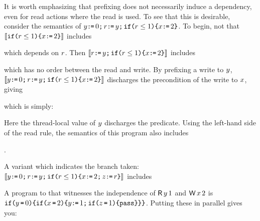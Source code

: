 It is worth emphasizing that prefixing does not necessarily induce a
dependency, even for read actions where the read is used.  To see that this
is desirable, consider  the semantics of
$\bLoc\GETS0\SEMI\aReg\GETS\bLoc\SEMI\IF{\aReg\leq1}\THEN \aLoc\GETS 2\FI$.
To begin, not that 
$\sem{\IF{\aReg\leq1}\THEN \aLoc\GETS 2\FI}$ includes
\begin{tikzinline}[node distance=1em]
\end{tikzinline}
which depends on $\aReg$.
Then $\sem{\aReg\GETS\bLoc\SEMI\IF{\aReg\leq1}\THEN \aLoc\GETS 2\FI}$ includes
\begin{tikzdisplay}[node distance=1em]
\end{tikzdisplay}
which has no order between the read and write.
By prefixing a write to $\bLoc$, $\sem{\bLoc\GETS0\SEMI\aReg\GETS\bLoc\SEMI\IF{\aReg\leq1}\THEN \aLoc\GETS
  2\FI}$ discharges the precondition of the write to $\aLoc$, giving
\begin{tikzinline}[node distance=1em]
\end{tikzinline}
which is simply:
\begin{tikzdisplay}[node distance=1em]
\end{tikzdisplay}
Here the thread-local value of $\bLoc$ discharges the predicate.
Using the left-hand side of the read rule, the semantics of this program also includes
\begin{tikzinline}[node distance=1em]
\end{tikzinline}.

A variant which indicates the branch taken:
$\sem{\bLoc\GETS0\SEMI\aReg\GETS\bLoc\SEMI\IF{\aReg\leq1}\THEN
  \aLoc\GETS2\SEMI\cLoc\GETS\aReg\FI}$
includes
\begin{tikzdisplay}[node distance=1em]
\end{tikzdisplay}
A program to that witnesses the independence of $\DR\bLoc1$ and $\DW\aLoc2$ is
\begin{math}
  \IF{\bLoc\EQ0}\THEN
    \IF{\aLoc\EQ2}\THEN
      \bLoc\GETS1\SEMI
      \IF{\cLoc\EQ1}\THEN\PASS\FI
    \FI
  \FI
\end{math}.
Putting these in parallel gives you:
\begin{tikzdisplay}[node distance=1em]
\end{tikzdisplay}

